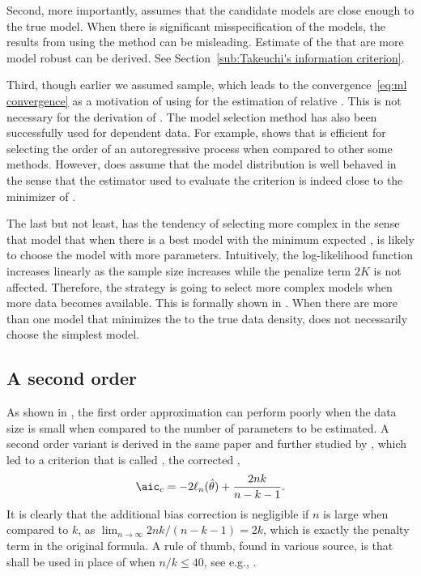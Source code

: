 Second, more importantly, \aic assumes that the candidate models are close
enough to the true model. When there is significant misspecification of the
models, the results from using the \aic method can be misleading. Estimate of
the \kld that are more model robust can be derived. See
Section~\ref{sub:Takeuchi's information criterion}.

Third, though earlier we assumed \iid sample, which leads to the
convergence~\ref{eq:ml convergence} as a motivation of using \mle for the
estimation of relative \kld. This is not necessary for the derivation of \aic.
The \aic model selection method has also been successfully used for dependent
data. For example, \cite{Lee:2001tm} shows that \aic is efficient for
selecting the order of an autoregressive process when compared to other some
methods. However, \aic does assume that the model distribution
is well behaved in the sense that the estimator used to evaluate the criterion
is indeed close to the minimizer of \kld.

The last but not least, \aic has the tendency of selecting more complex in the
sense that model that when there is a best model with the minimum expected
\kld, \aic is likely to choose the model with more parameters. Intuitively,
the log-likelihood function increases linearly as the sample size increases
while the penalize term $2K$ is not affected. Therefore, the \aic strategy is
going to select more complex models when more data becomes available. This is
formally shown in \cite{Sin:1996vs}. When there are more than one model that
minimizes the \kld to the true data density, \aic does not necessarily choose
the simplest model.

\subsection{A second order \protect\aic}
\label{sub:A second order aic}

As shown in \cite{Sugiura:1978be}, the first order approximation can perform
poorly when the data size is small when compared to the number of parameters
to be estimated. A second order variant is derived in the same paper and
further studied by \cite{Hurvich:1989ev}, which led to a criterion that is
called \aicc, the corrected \aic,
\begin{equation}
  \aicc = -2\ell_n(\hat\theta) + \frac{2nk}{n-k-1}.
\end{equation}
It is clearly that the additional bias correction is negligible if $n$ is
large when compared to $k$, as $\lim_{n\to\infty}2nk/(n-k-1) = 2k$, which is
exactly the penalty term in the original \aic formula. A rule of thumb, found
in various source, is that \aicc shall be used in place of \aic when
$n/k\le40$, see e.g., \cite[][sec.~2.4]{Burnham:2002wc}.

